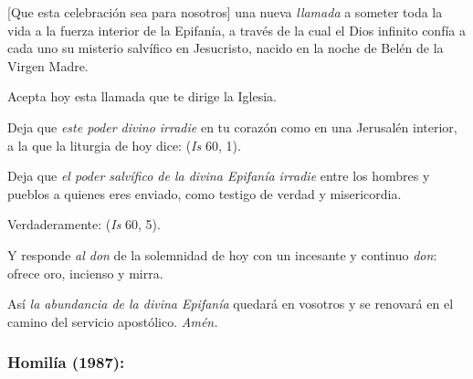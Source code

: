 \begin{body}
					{[}Que esta celebración sea para nosotros{]} una nueva \emph{llamada} a someter toda la vida a la fuerza interior de la Epifanía, a través de la cual el Dios infinito confía a cada uno su misterio salvífico en Jesucristo, nacido en la noche de Belén de la Virgen Madre.
					
					Acepta hoy esta llamada que te dirige la Iglesia.
					
					Deja que \emph{este poder divino irradie} en tu corazón como en una Jerusalén interior, a la que la liturgia de hoy dice:  (\emph{Is} 60, 1).
					
					Deja que \emph{el poder salvífico de la divina Epifanía irradie} entre los hombres y pueblos a quienes eres enviado, como testigo de verdad y misericordia.
					
					Verdaderamente:  (\emph{Is} 60, 5).
					
					Y responde \emph{al don} de la solemnidad de hoy con un incesante y continuo \emph{don}: ofrece oro, incienso y mirra.
					
					Así \emph{la abundancia de la divina Epifanía} quedará en vosotros y se renovará en el camino del servicio apostólico. \emph{Amén.}					
				\end{body}
			
			
			\subsubsection{Homilía (1987):}
			
				
